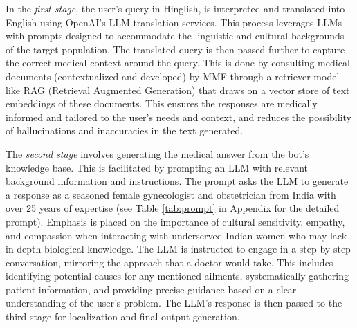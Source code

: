  
In the \textit{first stage}, the user's query in Hinglish, is interpreted and translated into English using OpenAI's LLM translation services. This process leverages LLMs with prompts designed to accommodate the linguistic and cultural backgrounds of the target population. The translated query is then passed further to capture the correct medical context around the query. This is done by consulting medical documents (contextualized and developed) by MMF through a retriever model like RAG (Retrieval Augmented Generation) that draws on a vector store of text embeddings of these documents.  This ensures the responses are medically informed and tailored to the user's needs and context, and reduces the possibility of hallucinations and inaccuracies in the text generated.

The \textit{second stage} involves generating the medical answer from the bot's knowledge base. This is facilitated by prompting an LLM with relevant background information and instructions. The prompt asks the LLM to generate a response as a seasoned female gynecologist and obstetrician from India with over 25 years of expertise (see Table \ref{tab:prompt} in Appendix for the detailed prompt). Emphasis is placed on the importance of cultural sensitivity, empathy, and compassion when interacting with underserved Indian women who may lack in-depth biological knowledge. The LLM is instructed to engage in a step-by-step conversation, mirroring the approach that a doctor would take. This includes identifying potential causes for any mentioned ailments, systematically gathering patient information, and providing precise guidance based on a clear understanding of the user's problem. The LLM's response is then passed to the third stage for localization and final output generation.

